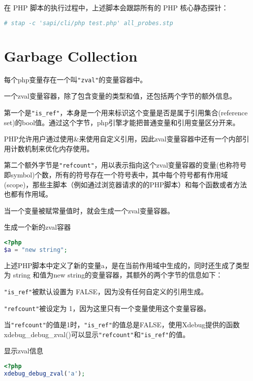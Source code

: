 在 PHP 脚本的执行过程中，上述脚本会跟踪所有的 PHP 核心静态探针：

\begin{lstlisting}[language=bash]
# stap -c 'sapi/cli/php test.php' all_probes.stp
\end{lstlisting}


\section{Garbage Collection}

每个php变量存在一个叫\texttt{"zval"}的变量容器中。


一个zval变量容器，除了包含变量的类型和值，还包括两个字节的额外信息。

第一个是\texttt{"is\_ref"}，本身是一个用来标识这个变量是否是属于引用集合(reference set)的bool值。通过这个字节，php引擎才能把普通变量和引用变量区分开来。

PHP允许用户通过使用\&来使用自定义引用，因此zval变量容器中还有一个内部引用计数机制来优化内存使用。

第二个额外字节是\texttt{"refcount"}，用以表示指向这个zval变量容器的变量(也称符号即symbol)个数，所有的符号存在一个符号表中，其中每个符号都有作用域(scope)，那些主脚本（例如通过浏览器请求的的PHP脚本）和每个函数或者方法也都有作用域。

当一个变量被赋常量值时，就会生成一个zval变量容器。

\begin{example}
生成一个新的zval容器
\begin{lstlisting}[language=PHP]
<?php
$a = "new string";
\end{lstlisting}
\end{example}

上述PHP脚本中定义了新的变量a，是在当前作用域中生成的，同时还生成了类型为 string 和值为new string的变量容器，其额外的两个字节的信息如下：

\begin{compactitem}
\item \texttt{"is\_ref"}被默认设置为 FALSE，因为没有任何自定义的引用生成。
\item \texttt{"refcount"}被设定为 1，因为这里只有一个变量使用这个变量容器。
\end{compactitem}

当\texttt{"refcount"}的值是1时，\texttt{"is\_ref"}的值总是FALSE，使用Xdebug提供的函数 xdebug\_debug\_zval()可以显示\texttt{"refcount"}和\texttt{"is\_ref"}的值。

\begin{example}
显示zval信息
\begin{lstlisting}[language=PHP]
<?php
xdebug_debug_zval('a');
\end{lstlisting}
\end{example}


